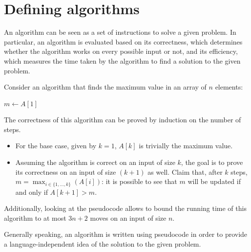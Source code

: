 \documentclass{report}
\begin{document}
\section{Defining algorithms}
An algorithm can be seen as a set of instructions to solve a given problem. \newline
In particular, an algorithm is evaluated based on its correctness, which determines whether the algorithm works on every possible input or not, and its efficiency, which measures the time taken by the algorithm to find a solution to the given problem.
\begin{examplebox}
    Consider an algorithm that finds the maximum value in an array of $\displaystyle n$ elements:
    \begin{algorithm}[H]
    
        $m \gets A[1]$\;
        \;
    \end{algorithm}
    \noindent The correctness of this algorithm can be proved by induction on the number of steps.
    \begin{itemize}
        \item For the base case, given by $\displaystyle k = 1$, $\displaystyle A[k]$ is trivially the maximum value.
        \item Assuming the algorithm is correct on an input of size $\displaystyle k$, the goal is to prove its correctness on an input of size $\displaystyle (k + 1)$ as well. \newline
        Claim that, after $\displaystyle k$ steps, $\displaystyle m = \max_{i \in \{1, \dots, k\}}(A[i])$: it is possible to see that $\displaystyle m$ will be updated if and only if $\displaystyle A[k + 1] > m$.
    \end{itemize}
    Additionally, looking at the pseudocode allows to bound the running time of this algorithm to at most $\displaystyle 3n + 2$ moves on an input of size $\displaystyle n$.
\end{examplebox}
\noindent Generally speaking, an algorithm is written using pseudocode in order to provide a language-independent idea of the solution to the given problem.
\end{document}
